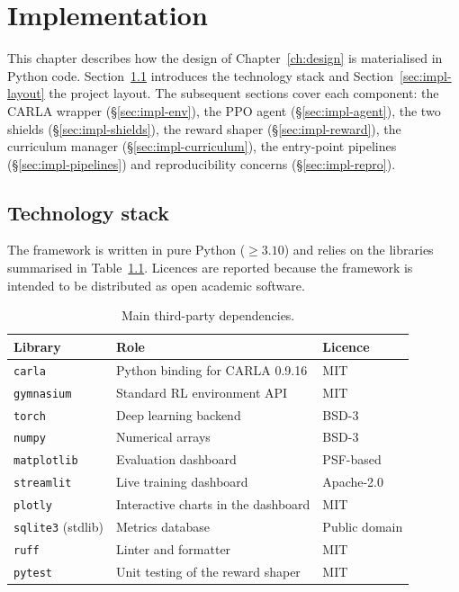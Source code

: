 
\chapter{Implementation}\label{ch:implementation}

This chapter describes how the design of Chapter~\ref{ch:design} is materialised in Python code.
Section~\ref{sec:impl-stack} introduces the technology stack and
Section~\ref{sec:impl-layout} the project layout. The subsequent sections cover each component:
the CARLA wrapper (\S\ref{sec:impl-env}), the PPO agent (\S\ref{sec:impl-agent}), the two shields
(\S\ref{sec:impl-shields}), the reward shaper (\S\ref{sec:impl-reward}), the curriculum manager
(\S\ref{sec:impl-curriculum}), the entry-point pipelines (\S\ref{sec:impl-pipelines}) and
reproducibility concerns (\S\ref{sec:impl-repro}).

\section{Technology stack}\label{sec:impl-stack}

The framework is written in pure Python (\(\ge 3.10\)) and relies on the libraries summarised in
Table~\ref{tab:stack}. Licences are reported because the framework is intended to be distributed as
open academic software.

\begin{table}[H]
  \centering
  \caption{Main third-party dependencies.}
  \label{tab:stack}
  \small
  \begin{tabular}{@{}lll@{}}
    \toprule
    \textbf{Library} & \textbf{Role}                              & \textbf{Licence} \\
    \midrule
    \texttt{carla}         & Python binding for CARLA 0.9.16            & MIT \\
    \texttt{gymnasium}     & Standard RL environment API                & MIT \\
    \texttt{torch}         & Deep learning backend                      & BSD-3 \\
    \texttt{numpy}         & Numerical arrays                           & BSD-3 \\
    \texttt{matplotlib}    & Evaluation dashboard                       & PSF-based \\
    \texttt{streamlit}     & Live training dashboard                    & Apache-2.0 \\
    \texttt{plotly}        & Interactive charts in the dashboard        & MIT \\
    \texttt{sqlite3} (stdlib) & Metrics database                        & Public domain \\
    \texttt{ruff}          & Linter and formatter                       & MIT \\
    \texttt{pytest}        & Unit testing of the reward shaper          & MIT \\
    \bottomrule
  \end{tabular}
\end{table}

